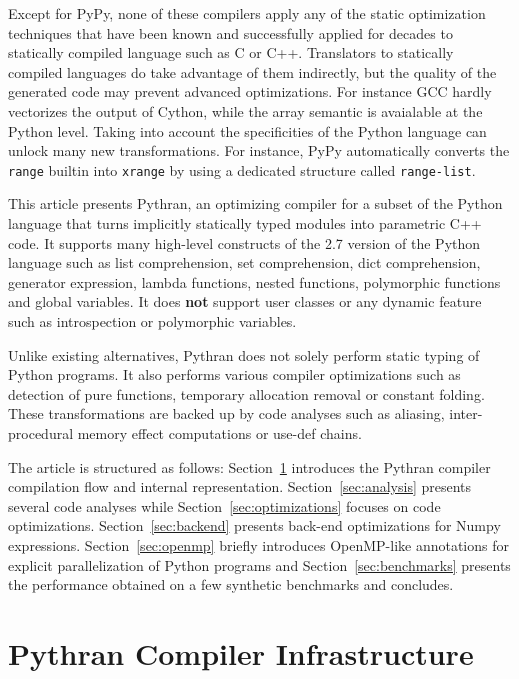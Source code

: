 \documentclass[10pt, onecolumn, preprint]{sigplanconf}
\begin{document}
Except for PyPy, none of these compilers apply any of the static optimization
techniques that have been known and successfully applied 
for decades to statically compiled language such as C or C++.  Translators to
statically compiled languages do take advantage of them indirectly, but the
quality of the generated code may prevent advanced optimizations. For instance
GCC hardly vectorizes the output of Cython, while the array semantic is
avaialable at the Python level. Taking into account the specificities of the
Python language can unlock many new transformations.  For instance, PyPy
automatically converts the \texttt{range} builtin into \texttt{xrange} by using
a dedicated structure called \texttt{range-list}.

This article presents Pythran, an optimizing compiler for a subset of the
Python language that turns implicitly statically typed modules into parametric
C++ code. It supports many high-level constructs of the 2.7 version of the
Python language such as list comprehension, set comprehension, dict
comprehension, generator expression, lambda functions, nested functions,
polymorphic functions and global variables. It does \textbf{not} support user
classes or any dynamic feature such as introspection or polymorphic variables.

Unlike existing alternatives, Pythran does not solely perform static typing of
Python programs. It also performs various compiler optimizations such as
detection of pure functions, temporary allocation removal or constant folding.
These transformations are backed up by code analyses such as aliasing,
inter-procedural memory effect computations or use-def chains.

The article is structured as follows: Section~\ref{sec:infrastructure}
introduces the Pythran compiler compilation flow and internal representation.
Section~\ref{sec:analysis} presents several code analyses while
Section~\ref{sec:optimizations} focuses on code optimizations.
Section~\ref{sec:backend} presents back-end optimizations for Numpy
expressions. Section~\ref{sec:openmp}  briefly introduces OpenMP-like
annotations for explicit parallelization of Python programs and
Section~\ref{sec:benchmarks} presents the performance obtained on a few
synthetic benchmarks and concludes.


\section{Pythran Compiler Infrastructure}
\label{sec:infrastructure}
\end{document}
